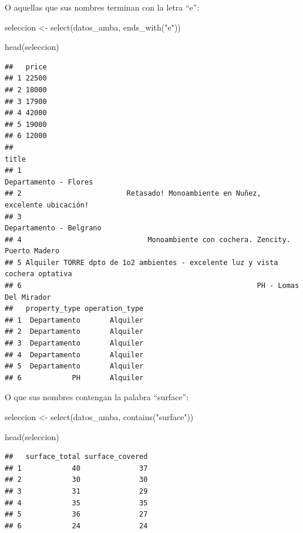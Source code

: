 \documentclass[
  spanish,
]{book}
\newenvironment{Shaded}{\begin{snugshade}}{\end{snugshade}}
\newcommand{\FunctionTok}[1]{\textcolor[rgb]{0.00,0.00,0.00}{#1}}
\newcommand{\NormalTok}[1]{#1}
\newcommand{\OtherTok}[1]{\textcolor[rgb]{0.56,0.35,0.01}{#1}}
\newcommand{\StringTok}[1]{\textcolor[rgb]{0.31,0.60,0.02}{#1}}
\begin{document}
O aquellas que sus nombres terminan con la letra ``e'':

\begin{Shaded}
\begin{Highlighting}[]
\NormalTok{seleccion }\OtherTok{\textless{}{-}} \FunctionTok{select}\NormalTok{(datos\_amba, }\FunctionTok{ends\_with}\NormalTok{(}\StringTok{"e"}\NormalTok{))}

\FunctionTok{head}\NormalTok{(seleccion)}
\end{Highlighting}
\end{Shaded}

\begin{verbatim}
##   price
## 1 22500
## 2 18000
## 3 17900
## 4 42000
## 5 19000
## 6 12000
##                                                                           title
## 1                                                         Departamento - Flores
## 2                         Retasado! Monoambiente en Nuñez, excelente ubicación!
## 3                                                       Departamento - Belgrano
## 4                              Monoambiente con cochera. Zencity. Puerto Madero
## 5 Alquiler TORRE dpto de 1o2 ambientes - excelente luz y vista cochera optativa
## 6                                                        PH - Lomas Del Mirador
##   property_type operation_type
## 1  Departamento       Alquiler
## 2  Departamento       Alquiler
## 3  Departamento       Alquiler
## 4  Departamento       Alquiler
## 5  Departamento       Alquiler
## 6            PH       Alquiler
\end{verbatim}

O que sus nombres contengan la palabra ``surface'':

\begin{Shaded}
\begin{Highlighting}[]
\NormalTok{seleccion }\OtherTok{\textless{}{-}} \FunctionTok{select}\NormalTok{(datos\_amba, }\FunctionTok{contains}\NormalTok{(}\StringTok{"surface"}\NormalTok{))}

\FunctionTok{head}\NormalTok{(seleccion)}
\end{Highlighting}
\end{Shaded}

\begin{verbatim}
##   surface_total surface_covered
## 1            40              37
## 2            30              30
## 3            31              29
## 4            35              35
## 5            36              27
## 6            24              24
\end{verbatim}
\end{document}

